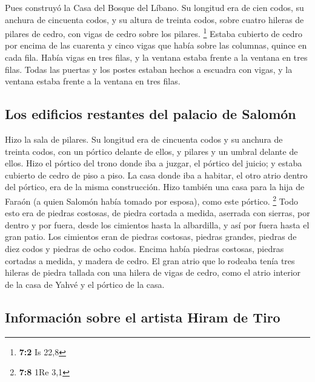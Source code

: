 \begin{paracol}{2}
 Pues construyó la Casa del Bosque del Líbano. Su longitud
era de cien codos, su anchura de cincuenta codos, y su altura de treinta
codos, sobre cuatro hileras de pilares de cedro, con vigas de cedro
sobre los pilares. \footnote{\textbf{7:2} Is 22,8}  Estaba
cubierto de cedro por encima de las cuarenta y cinco vigas que había
sobre las columnas, quince en cada fila.  Había vigas en
tres filas, y la ventana estaba frente a la ventana en tres filas.
 Todas las puertas y los postes estaban hechos a escuadra
con vigas, y la ventana estaba frente a la ventana en tres filas.

\hypertarget{los-edificios-restantes-del-palacio-de-salomuxf3n}{%
\subsection{Los edificios restantes del palacio de
Salomón}\label{los-edificios-restantes-del-palacio-de-salomuxf3n}}

 Hizo la sala de pilares. Su longitud era de cincuenta
codos y su anchura de treinta codos, con un pórtico delante de ellos, y
pilares y un umbral delante de ellos.  Hizo el pórtico del
trono donde iba a juzgar, el pórtico del juicio; y estaba cubierto de
cedro de piso a piso.  La casa donde iba a habitar, el
otro atrio dentro del pórtico, era de la misma construcción. Hizo
también una casa para la hija de Faraón (a quien Salomón había tomado
por esposa), como este pórtico. \footnote{\textbf{7:8} 1Re 3,1}
 Todo esto era de piedras costosas, de piedra cortada a
medida, aserrada con sierras, por dentro y por fuera, desde los
cimientos hasta la albardilla, y así por fuera hasta el gran patio.
 Los cimientos eran de piedras costosas, piedras grandes,
piedras de diez codos y piedras de ocho codos.  Encima
había piedras costosas, piedras cortadas a medida, y madera de cedro.
 El gran atrio que lo rodeaba tenía tres hileras de
piedra tallada con una hilera de vigas de cedro, como el atrio interior
de la casa de Yahvé y el pórtico de la casa.

\hypertarget{informaciuxf3n-sobre-el-artista-hiram-de-tiro}{%
\subsection{Información sobre el artista Hiram de
Tiro}\label{informaciuxf3n-sobre-el-artista-hiram-de-tiro}}


\end{paracol}
